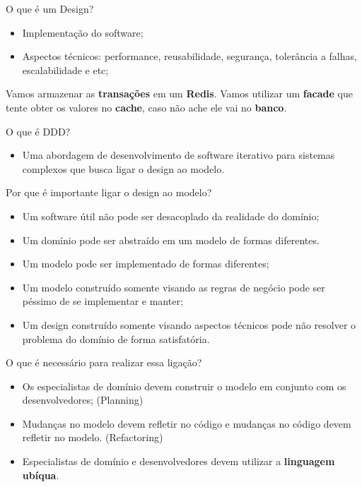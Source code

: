 \documentclass[aspectratio=169]{beamer}
\begin{document}
\begin{frame}{O que é um Design?}	
	\begin{itemize}	
		\item Implementação do software;
		\item Aspectos técnicos: performance, reusabilidade, segurança, tolerância a falhas, escalabilidade e etc;
	\end{itemize}
	Vamos armazenar as \textbf{transações} em um \textbf{Redis}. Vamos utilizar um \textbf{facade} que tente obter os valores no \textbf{cache}, caso não ache ele vai no \textbf{banco}. 
\end{frame}

\begin{frame}{O que é DDD?}	
	\begin{itemize}	
		\item Uma abordagem de desenvolvimento de software iterativo para sistemas complexos que busca ligar o design ao modelo.
	\end{itemize}
\end{frame}

\begin{frame}{Por que é importante ligar o design ao modelo?}	
	\begin{itemize}	
		\item Um software útil não pode ser desacoplado da realidade do domínio;
		\item Um domínio pode ser abstraído em um modelo de formas diferentes.
		\item Um modelo pode ser implementado de formas diferentes;
		\item Um modelo construído somente visando as regras de negócio pode ser péssimo de se implementar e manter;
		\item Um design construído somente visando aspectos técnicos pode não resolver o problema do domínio de forma satisfatória.
	\end{itemize}
\end{frame}

\begin{frame}{O que é necessário para realizar essa ligação?}	
	\begin{itemize}	
		\item Os especialistas de domínio devem construir o modelo em conjunto com os desenvolvedores; (Planning)
		\item Mudanças no modelo devem refletir no código e mudanças no código devem refletir no modelo. (Refactoring)
		\item Especialistas de domínio e desenvolvedores devem utilizar a \textbf{linguagem ubíqua}.
	\end{itemize}
\end{frame}
\end{document}
